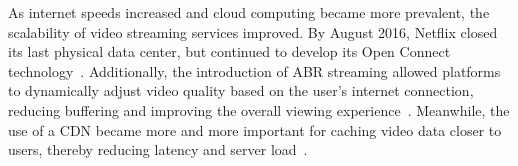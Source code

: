 As internet speeds increased and cloud computing became more prevalent, the scalability of video streaming services improved. By August 2016, Netflix closed its last physical data center, but continued to develop its Open Connect technology~\parencite{netflix_cloud}.
Additionally, the introduction of \ac{ABR} streaming allowed platforms to dynamically adjust video quality based on the user's internet connection, reducing buffering and improving the overall viewing experience~\parencite{abr}. Meanwhile, the use of a \ac{CDN} became more and more important for caching video data closer to users, thereby reducing latency and server load~\parencite{cdn_basic}.





